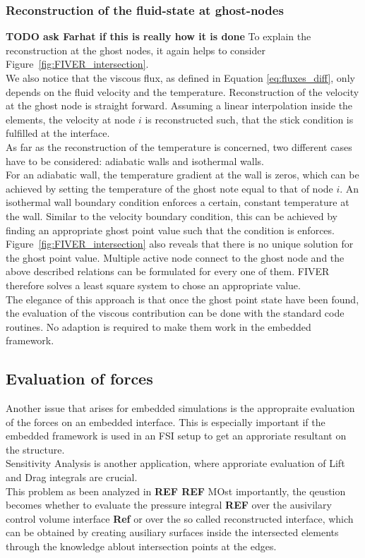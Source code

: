 \documentclass[../main.tex]{subfiles}
\begin{document}
\subsubsection{Reconstruction of the fluid-state at ghost-nodes}\label{sec:ghost_node_reconstruction}
\textbf{TODO ask Farhat if this is really how it is done}
To explain the reconstruction at the ghost nodes, it again helps to consider Figure~\ref{fig:FIVER_intersection}.\\
We also notice that the viscous flux, as defined in Equation \ref{eq:fluxes_diff}, only depends on the fluid velocity and the temperature.
Reconstruction of the velocity at the ghost node is straight forward. Assuming a linear interpolation inside the elements, the velocity at node $i$ is reconstructed such, that the stick condition is fulfilled at the interface.\\
As far as the reconstruction of the temperature is concerned, two different cases have to be considered: adiabatic walls and isothermal walls.\\
For an adiabatic wall, the temperature gradient at the wall is zeros, which can be achieved by setting the temperature of the ghost note equal to that of node $i$. An isothermal wall boundary condition enforces a certain, constant temperature at the wall. Similar to the velocity boundary condition, this can be achieved by finding an appropriate ghost point value such that the condition is enforces.\\
Figure~\ref{fig:FIVER_intersection} also reveals that there is no unique solution for the ghost point value. Multiple active node connect to the ghost node and the above described relations can be formulated for every one of them. \ac{FIVER} therefore solves a least square system to chose an appropriate value.\\
The elegance of this approach is that once the ghost point state have been found, the evaluation of the viscous contribution can be done with the standard code routines. No adaption is required to make them work in the embedded framework.


\subsection{Evaluation of forces}\label{sec:fiver_force_evaluation}
Another issue that arises for embedded simulations is the appropraite evaluation of the forces on an embedded interface. This is especially important if the embedded framework is used in an \ac{FSI} setup to get an approriate resultant on the structure.\\
Sensitivity Analysis is another application, where approriate evaluation of Lift and Drag integrals are crucial.\\
This problem as been analyzed in \textbf{REF REF}
MOst importantly, the qeustion becomes whether to evaluate the pressure integral \textbf{REF} over the ausivilary control volume interface \textbf{Ref} or over the so called reconstructed interface, which can be obtained by creating ausiliary surfaces inside the intersected elements through the knowledge ablout intersection points at the edges.
\end{document}
